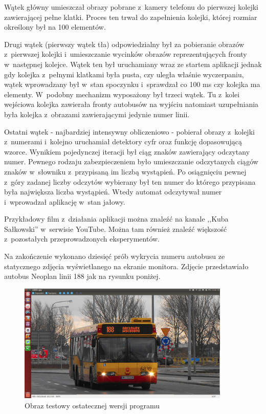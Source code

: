 Wątek główny umieszczał obrazy pobrane z~kamery telefonu do
pierwszej kolejki zawierającej pełne klatki. Proces ten trwał
do zapełnienia kolejki, której rozmiar określony był na 100 elementów.

Drugi wątek (pierwszy wątek tła) odpowiedzialny był za pobieranie 
obrazów z~pierwszej kolejki i~umieszczanie wycinków obrazów 
reprezentujących fronty
w~następnej kolejce. Wątek ten był uruchamiany wraz ze startem aplikacji
jednak gdy kolejka z~pełnymi klatkami była pusta, czy uległa właśnie 
wyczerpaniu, wątek wprowadzany był w~stan spoczynku i~sprawdzał co
100 ms czy kolejka ma elementy. W~podobny mechanizm wyposażony był
trzeci wątek. Tu z~kolei wejściowa kolejka zawierała fronty autobusów
na wyjściu natomiast uzupełniania była kolejka z~obrazami zawierającymi
jedynie numer linii.

Ostatni wątek - najbardziej intensywny obliczeniowo - pobierał obrazy
z~kolejki z~numerami i~kolejno uruchamiał detektory cyfr oraz 
funkcję dopasowującą wzorce. Wynikiem pojedynczej iteracji był 
ciąg znaków zawierający odczytany numer. Pewnego rodzaju zabezpieczeniem
było umieszczanie odczytanych ciągów znaków w~słowniku z~przypisaną
im liczbą wystąpień. Po osiągnięciu pewnej z~góry zadanej liczby
odczytów wybierany był ten numer do którego przypisana była największa 
liczba wystąpień. Wtedy automat odczytywał numer i~wprowadzał 
aplikację w~stan jałowy.

Przykładowy film z~działania aplikacji można znaleźć na kanale
,,Kuba Sałkowski'' w~serwisie YouTube. Można tam również znaleźć 
większość z~pozostałych przeprowadzonych eksperymentów.

Na zakończenie wykonano dziesięć prób wykrycia numeru autobusu
ze statycznego zdjęcia wyświetlanego na ekranie monitora.
Zdjęcie przedstawiało autobus Neoplan linii 188 jak na rysunku poniżej.

\begin{figure}[h!]
    \centering
    \includegraphics[width=0.9\textwidth]{img/imp_final_test_img}
    \caption{Obraz testowy ostatecznej wersji programu}
\end{figure}


